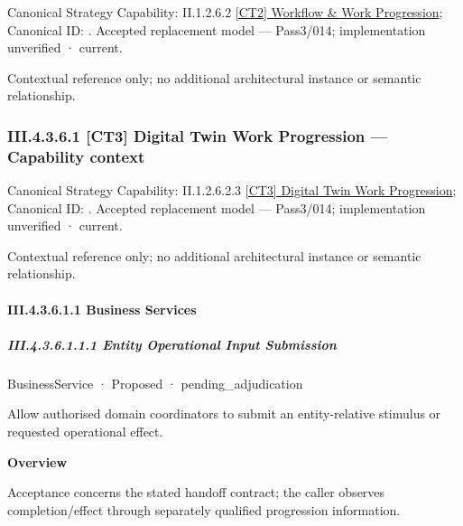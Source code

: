 {\small Canonical Strategy Capability: II.1.2.6.2 \hyperref[element:2813ee6e848a467ab77fc34108807c26]{[CT2] Workflow \& Work Progression}; Canonical ID: \texttt{}. Accepted replacement model — Pass3/014; implementation unverified · current.}\par
Contextual reference only; no additional architectural instance or semantic relationship.\par
\subsubsection*{III.4.3.6.1 [CT3] Digital Twin Work Progression — Capability context}
\label{navigation:III.4.3.6.1}

{\small Canonical Strategy Capability: II.1.2.6.2.3 \hyperref[element:251ce46fb18d4398ad49296eeea73bbc]{[CT3] Digital Twin Work Progression}; Canonical ID: \texttt{}. Accepted replacement model — Pass3/014; implementation unverified · current.}\par
Contextual reference only; no additional architectural instance or semantic relationship.\par
\paragraph*{III.4.3.6.1.1 Business Services}
\label{navigation:III.4.3.6.1.1}

\subparagraph*{III.4.3.6.1.1.1 Entity Operational Input Submission}
\label{navigation:III.4.3.6.1.1.1}

\label{element:6a27b36b624444d4b09e68f286045d46}
{\small BusinessService · Proposed · pending\_adjudication}\par

Allow authorised domain coordinators to submit an entity-relative stimulus or requested operational effect.



\textbf{Overview}



Acceptance concerns the stated handoff contract; the caller observes completion/effect through separately qualified progression information.



